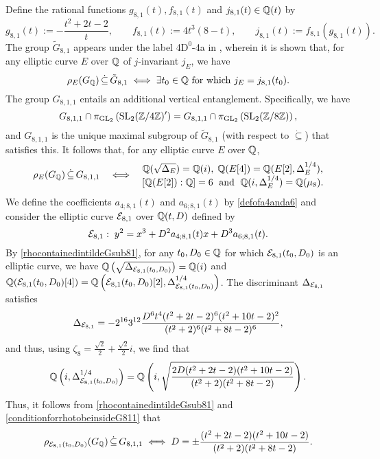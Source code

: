Define the rational functions $g_{8,1}(t), f_{8,1}(t)$ and $j_{8,1}(t) \in \mathbb{Q}(t)$ by
\[
g_{8,1}(t) := - \frac{t^2 + 2t - 2}{t}, \quad\quad f_{8,1}(t) := 4t^3(8-t), \quad\quad j_{8,1}(t) := f_{8,1}(g_{8,1}(t)).
\]
The group $\tilde{G}_{8,1}$ appears under the label 4$\text{D}^0$-4a in \cite{sutherlandzywina}, wherein it is shown that, for any elliptic curve $E$ over $\mathbb{Q}$ of $j$-invariant $j_E$, we have
\[
\rho_{E}(G_{\mathbb{Q}}) \, \dot\subseteq \, \tilde{G}_{8,1} \; \Longleftrightarrow \; \exists t_0 \in \mathbb{Q} \text{ for which } j_E = j_{8,1}(t_0).
\]
The group $G_{8,1,1}$ entails an additional vertical entanglement. Specifically, we have
\[
G_{8,1,1} \cap \pi_{\operatorname{GL}_2}\left( \operatorname{SL}_2(\mathbb{Z}/4\mathbb{Z})' \right) = G_{8,1,1} \cap \pi_{\operatorname{GL}_2}\left( \operatorname{SL}_2(\mathbb{Z}/8\mathbb{Z}) \right),
\]
and $G_{8,1,1}$ is the unique maximal subgroup of $\tilde{G}_{8,1}$ (with respect to $\dot\subseteq$) that satisfies this. It follows that, for any elliptic curve $E$ over $\mathbb{Q}$,
\begin{equation} \label{conditionforrhotobeinsideG811}
\rho_{E}(G_\mbq) \, \dot\subseteq \, G_{8,1,1} \quad \Longleftrightarrow \quad \begin{matrix} \mbq(\sqrt{\gD_E}) = \mbq(i), \; \mbq(E[4]) = \mbq(E[2],\gD_E^{1/4}), \\ [ \mbq(E[2]) : \mbq] = 6 \; \text{ and } \; \mbq(i, \gD_E^{1/4}) = \mbq(\mu_8). \end{matrix}
\end{equation}
We define the coefficients $a_{4;8,1}(t)$ and $a_{6;8,1}(t)$ by \eqref{defofa4anda6} and consider the elliptic curve $\mathcal{E}_{8,1}$ over $\mathbb{Q}(t,D)$ defined by 
\[
\mathcal{E}_{8,1} : \; y^2 = x^3 + D^2a_{4;8,1}(t) x + D^3a_{6;8,1}(t).
\]
By \eqref{rhocontainedintildeGsub81}, for any 
$t_0, D_0 \in \mathbb{Q}$ for which $\mathcal{E}_{8,1}(t_0,D_0)$ is an elliptic curve, we have $\mathbb{Q}\left( \sqrt{\Delta_{\mathcal{E}_{8,1}(t_0,D_0)}} \right) = \mathbb{Q}(i)$ and $\mathbb{Q}(\mathcal{E}_{8,1}(t_0,D_0)[4]) = \mathbb{Q}\left( \mathcal{E}_{8,1}(t_0,D_0)[2],\Delta_{\mathcal{E}_{8,1}(t_0,D_0)}^{1/4} \right)$.
The discriminant $\Delta_{\mathcal{E}_{8,1}}$ satisfies
\[
\Delta_{\mathcal{E}_{8,1}} = - 2^{16} 3^{12} \frac{D^6t^4(t^2 +2t-2)^6(t^2+10t-2)^2}{(t^2+2)^6(t^2+8t-2)^6},
\]
and thus, using $\zeta_8 = \frac{\sqrt{2}}{2} + \frac{\sqrt{2}}{2} i$, we find that
\[
\mathbb{Q}\left( i, \Delta_{\mathcal{E}_{8,1}(t_0,D_0)}^{1/4} \right) = \mathbb{Q}\left( i, \sqrt{\frac{2D(t^2 +2t-2)(t^2+10t-2)}{(t^2+2)(t^2+8t-2)}} \right).
\]
Thus, it follows from \eqref{rhocontainedintildeGsub81} and \eqref{conditionforrhotobeinsideG811} that
\[
\rho_{\mathcal{E}_{8,1}(t_0,D_0)}(G_{\mathbb{Q}}) \, \dot\subseteq \, G_{8,1,1} \; \Longleftrightarrow \; D = \pm \frac{(t^2 +2t-2)(t^2+10t-2)}{(t^2+2)(t^2+8t-2)}.
\]
